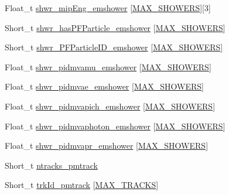 \begin{DoxyCompactItemize}
Float\-\_\-t \hyperlink{classanatree_aef23f9da33311f1e7a1382be85a425f9}{shwr\-\_\-mip\-Eng\-\_\-emshower} \mbox{[}\hyperlink{anatree__core__v09410002__orig_8h_aa8deaf72f1f7bd4b88c7d1ea07590801}{M\-A\-X\-\_\-\-S\-H\-O\-W\-E\-R\-S}\mbox{]}\mbox{[}3\mbox{]}
\item 
Short\-\_\-t \hyperlink{classanatree_ae847c0b22deb9dd4bb227ec90e1c4a03}{shwr\-\_\-has\-P\-F\-Particle\-\_\-emshower} \mbox{[}\hyperlink{anatree__core__v09410002__orig_8h_aa8deaf72f1f7bd4b88c7d1ea07590801}{M\-A\-X\-\_\-\-S\-H\-O\-W\-E\-R\-S}\mbox{]}
\item 
Short\-\_\-t \hyperlink{classanatree_ad6193b7b49d7827a3f35511da315daeb}{shwr\-\_\-\-P\-F\-Particle\-I\-D\-\_\-emshower} \mbox{[}\hyperlink{anatree__core__v09410002__orig_8h_aa8deaf72f1f7bd4b88c7d1ea07590801}{M\-A\-X\-\_\-\-S\-H\-O\-W\-E\-R\-S}\mbox{]}
\item 
Float\-\_\-t \hyperlink{classanatree_a73a0b351b3500cf71010cfc14920165f}{shwr\-\_\-pidmvamu\-\_\-emshower} \mbox{[}\hyperlink{anatree__core__v09410002__orig_8h_aa8deaf72f1f7bd4b88c7d1ea07590801}{M\-A\-X\-\_\-\-S\-H\-O\-W\-E\-R\-S}\mbox{]}
\item 
Float\-\_\-t \hyperlink{classanatree_aded5848a28c2143f3f99af58b7c303e1}{shwr\-\_\-pidmvae\-\_\-emshower} \mbox{[}\hyperlink{anatree__core__v09410002__orig_8h_aa8deaf72f1f7bd4b88c7d1ea07590801}{M\-A\-X\-\_\-\-S\-H\-O\-W\-E\-R\-S}\mbox{]}
\item 
Float\-\_\-t \hyperlink{classanatree_af75e1f3fdf9bde31f05fe50528f70780}{shwr\-\_\-pidmvapich\-\_\-emshower} \mbox{[}\hyperlink{anatree__core__v09410002__orig_8h_aa8deaf72f1f7bd4b88c7d1ea07590801}{M\-A\-X\-\_\-\-S\-H\-O\-W\-E\-R\-S}\mbox{]}
\item 
Float\-\_\-t \hyperlink{classanatree_a736dd41a0716c661ec1ffe5ec1124dce}{shwr\-\_\-pidmvaphoton\-\_\-emshower} \mbox{[}\hyperlink{anatree__core__v09410002__orig_8h_aa8deaf72f1f7bd4b88c7d1ea07590801}{M\-A\-X\-\_\-\-S\-H\-O\-W\-E\-R\-S}\mbox{]}
\item 
Float\-\_\-t \hyperlink{classanatree_a4eb600b604c899bc84335d6bced8e714}{shwr\-\_\-pidmvapr\-\_\-emshower} \mbox{[}\hyperlink{anatree__core__v09410002__orig_8h_aa8deaf72f1f7bd4b88c7d1ea07590801}{M\-A\-X\-\_\-\-S\-H\-O\-W\-E\-R\-S}\mbox{]}
\item 
Short\-\_\-t \hyperlink{classanatree_a8cd01b78cf453dae76434d5aa9e0d2a5}{ntracks\-\_\-pmtrack}
\item 
Short\-\_\-t \hyperlink{classanatree_a5db3ef8f3ce987b9359f6f2c0be8c9b7}{trk\-Id\-\_\-pmtrack} \mbox{[}\hyperlink{anatree__core__v09410002__orig_8h_a327fd4e796e4a0d78947524c96e4362e}{M\-A\-X\-\_\-\-T\-R\-A\-C\-K\-S}\mbox{]}

\end{DoxyCompactItemize}
